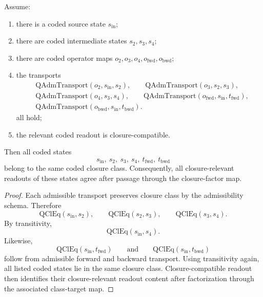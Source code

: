 \begin{theorem}\label{thm:qam-first-op-transport}
Assume:
\begin{enumerate}
\item there is a coded source state $s_{\mathrm{in}}$;
\item there are coded intermediate states $s_2,s_3,s_4$;
\item there are coded operator maps $o_2,o_3,o_4,o_{\mathrm{fwd}},o_{\mathrm{bwd}}$;
\item the transports
\[
\begin{aligned}
&\mathrm{QAdmTransport}(o_2,s_{\mathrm{in}},s_2),\qquad
\mathrm{QAdmTransport}(o_3,s_2,s_3),\\[0.15em]
&\mathrm{QAdmTransport}(o_4,s_3,s_4),\qquad
\mathrm{QAdmTransport}(o_{\mathrm{fwd}},s_{\mathrm{in}},t_{\mathrm{fwd}}),\\[0.15em]
&\mathrm{QAdmTransport}(o_{\mathrm{bwd}},s_{\mathrm{in}},t_{\mathrm{bwd}}).
\end{aligned}
\]
all hold;
\item the relevant coded readout is closure-compatible.
\end{enumerate}
Then all coded states
\[
s_{\mathrm{in}},\ s_2,\ s_3,\ s_4,\ t_{\mathrm{fwd}},\ t_{\mathrm{bwd}}
\]
belong to the same coded closure class. Consequently, all closure-relevant readouts of these states agree after passage through the closure-factor map.
\end{theorem}

\begin{proof}
Each admissible transport preserves closure class by the admissibility schema. Therefore
\[
\mathrm{QClEq}(s_{\mathrm{in}},s_2),\qquad
\mathrm{QClEq}(s_2,s_3),\qquad
\mathrm{QClEq}(s_3,s_4).
\]
By transitivity,
\[
\mathrm{QClEq}(s_{\mathrm{in}},s_4).
\]
Likewise,
\[
\mathrm{QClEq}(s_{\mathrm{in}},t_{\mathrm{fwd}})
\qquad\text{and}\qquad
\mathrm{QClEq}(s_{\mathrm{in}},t_{\mathrm{bwd}})
\]
follow from admissible forward and backward transport. Using transitivity again, all listed coded states lie in the same closure class. Closure-compatible readout then identifies their closure-relevant readout content after factorization through the associated class-target map.
\end{proof}

